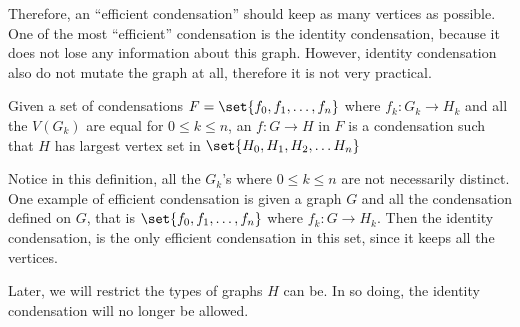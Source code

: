 Therefore, an ``efficient condensation'' should keep as many
vertices as possible.
One of the most ``efficient'' condensation is the
identity condensation, because it does not lose any information
about this graph.
However, identity condensation also do not mutate the graph
at all, therefore it is not very practical.

\begin{definition}
  Given a set of condensations \(F = \set{f_0, f_1, \ldots, f_n}\)
  where \(f_k: G_k \to H_k\)
  and all the \(V(G_k)\) are equal for \(0 \leq k \leq n\),
  an  \(f: G \to H\) in \(F\)
  is a condensation such that
  \(H\) has largest vertex set in
  \(\set{H_0, H_1, H_2, \ldots H_n}\)
\end{definition}

Notice in this definition,
all the \(G_k\)'s where \(0 \leq k \leq n\) are not
necessarily distinct.
One example of efficient condensation is
given a graph \(G\) and all the condensation defined on \(G\),
that is  \(\set{f_0, f_1, \ldots, f_n}\) where \(f_k: G \to H_k\).
Then the identity condensation,
is the only efficient condensation in this set,
since it keeps all the vertices.

Later, we will restrict the types of graphs \(H\) can be.
In so doing, the identity condensation will no longer be allowed.
